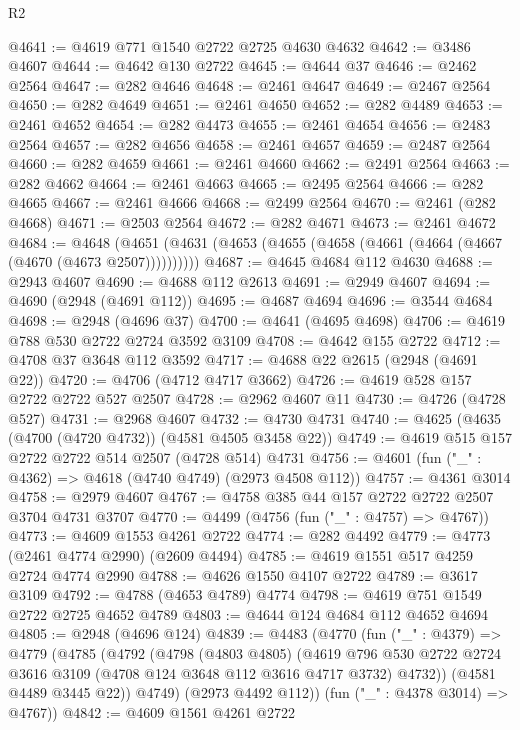 \begin{lexlean}{R2}
\begin{coremodule}
@4641 := @4619 @771 @1540 @2722 @2725 @4630 @4632
@4642 := @3486 @4607
@4644 := @4642 @130 @2722
@4645 := @4644 @37
@4646 := @2462 @2564
@4647 := @282 @4646
@4648 := @2461 @4647
@4649 := @2467 @2564
@4650 := @282 @4649
@4651 := @2461 @4650
@4652 := @282 @4489
@4653 := @2461 @4652
@4654 := @282 @4473
@4655 := @2461 @4654
@4656 := @2483 @2564
@4657 := @282 @4656
@4658 := @2461 @4657
@4659 := @2487 @2564
@4660 := @282 @4659
@4661 := @2461 @4660
@4662 := @2491 @2564
@4663 := @282 @4662
@4664 := @2461 @4663
@4665 := @2495 @2564
@4666 := @282 @4665
@4667 := @2461 @4666
@4668 := @2499 @2564
@4670 := @2461 (@282 @4668)
@4671 := @2503 @2564
@4672 := @282 @4671
@4673 := @2461 @4672
@4684 := @4648 (@4651 (@4631 (@4653 (@4655 (@4658 (@4661 (@4664 (@4667 (@4670 (@4673 @2507))))))))))
@4687 := @4645 @4684 @112 @4630
@4688 := @2943 @4607
@4690 := @4688 @112 @2613
@4691 := @2949 @4607
@4694 := @4690 (@2948 (@4691 @112))
@4695 := @4687 @4694
@4696 := @3544 @4684
@4698 := @2948 (@4696 @37)
@4700 := @4641 (@4695 @4698)
@4706 := @4619 @788 @530 @2722 @2724 @3592 @3109
@4708 := @4642 @155 @2722
@4712 := @4708 @37 @3648 @112 @3592
@4717 := @4688 @22 @2615 (@2948 (@4691 @22))
@4720 := @4706 (@4712 @4717 @3662)
@4726 := @4619 @528 @157 @2722 @2722 @527 @2507
@4728 := @2962 @4607 @11
@4730 := @4726 (@4728 @527)
@4731 := @2968 @4607
@4732 := @4730 @4731
@4740 := @4625 (@4635 (@4700 (@4720 @4732)) (@4581 @4505 @3458 @22))
@4749 := @4619 @515 @157 @2722 @2722 @514 @2507 (@4728 @514) @4731
@4756 := @4601 (fun ("_" : @4362) => @4618 (@4740 @4749) (@2973 @4508 @112))
@4757 := @4361 @3014
@4758 := @2979 @4607
@4767 := @4758 @385 @44 @157 @2722 @2722 @2507 @3704 @4731 @3707
@4770 := @4499 (@4756 (fun ("_" : @4757) => @4767))
@4773 := @4609 @1553 @4261 @2722
@4774 := @282 @4492
@4779 := @4773 (@2461 @4774 @2990) (@2609 @4494)
@4785 := @4619 @1551 @517 @4259 @2724 @4774 @2990
@4788 := @4626 @1550 @4107 @2722
@4789 := @3617 @3109
@4792 := @4788 (@4653 @4789) @4774
@4798 := @4619 @751 @1549 @2722 @2725 @4652 @4789
@4803 := @4644 @124 @4684 @112 @4652 @4694
@4805 := @2948 (@4696 @124)
@4839 := @4483
    (@4770
      (fun ("_" : @4379) =>
      @4779
        (@4785
          (@4792
            (@4798
              (@4803 @4805)
              (@4619
                @796
                @530
                @2722
                @2724
                @3616
                @3109
                (@4708 @124 @3648 @112 @3616 @4717 @3732)
                @4732))
            (@4581 @4489 @3445 @22))
          @4749)
        (@2973 @4492 @112))
      (fun ("_" : @4378 @3014) => @4767))
@4842 := @4609 @1561 @4261 @2722

\end{coremodule}
\end{lexlean}
